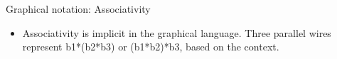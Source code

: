 \documentclass[11pt]{beamer}
\begin{document}
\begin{frame}{Graphical notation: Associativity} 

\begin{itemize}
\item Associativity is implicit in the graphical language. Three parallel
  wires represent {{b1*(b2*b3)}} or {{(b1*b2)*b3}}, based on the context.
\end{itemize}

\begin{center}
\end{center}

\end{frame}
\end{document}
